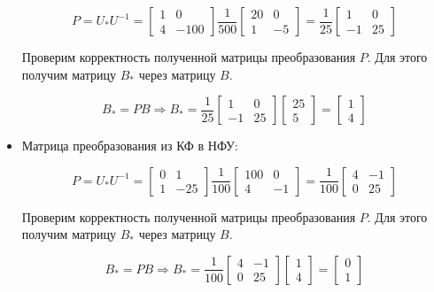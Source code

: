 \documentclass[14pt,a4paper,report]{report}
\begin{document}
\begin{itemize}
	\begin{equation*}
	\text{$P=U_{*}U^{-1}=\begin{bmatrix} 1 & 0 \\ 4 & -100 \end{bmatrix}\frac{1}{500}\begin{bmatrix} 20 & 0 \\ 1 & -5 \end{bmatrix}=\frac{1}{25}\begin{bmatrix} 1 & 0 \\ -1 & 25 \end{bmatrix}$}
	\end{equation*}
	
	Проверим корректность полученной матрицы преобразования $P$. Для этого получим матрицу $B_{*}$ через матрицу $B$.
	
	\begin{equation*}
	\text{$B_{*}=PB$}
	\Longrightarrow
	\text{$B_{*}=\frac{1}{25}\begin{bmatrix} 1 & 0 \\ -1 & 25 \end{bmatrix}\begin{bmatrix} 25 \\ 5 \end{bmatrix}=\begin{bmatrix} 1 \\ 4 \end{bmatrix}$}
	\end{equation*}
	
	\item Матрица преобразования из КФ в НФУ:
	
	\begin{equation*}
	\text{$P=U_{*}U^{-1}=\begin{bmatrix} 0 & 1 \\ 1 & -25 \end{bmatrix}\frac{1}{100}\begin{bmatrix} 100 & 0 \\ 4 & -1 \end{bmatrix}=\frac{1}{100}\begin{bmatrix} 4 & -1 \\ 0 & 25 \end{bmatrix}$}
	\end{equation*}
	
	Проверим корректность полученной матрицы преобразования $P$. Для этого получим матрицу $B_{*}$ через матрицу $B$.
	
	\begin{equation*}
	\text{$B_{*}=PB$}
	\Longrightarrow
	\text{$B_{*}=\frac{1}{100}\begin{bmatrix} 4 & -1 \\ 0 & 25 \end{bmatrix}\begin{bmatrix} 1 \\ 4 \end{bmatrix}=\begin{bmatrix} 0 \\ 1 \end{bmatrix}$}
	\end{equation*}
	

\end{itemize}
\end{document}
